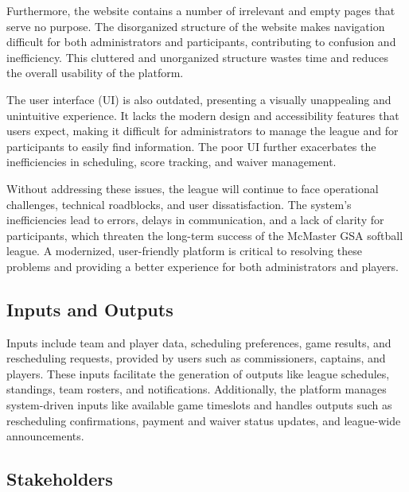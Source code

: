 \documentclass{article}
\begin{document}
Furthermore, the website contains a number of irrelevant and empty pages that serve no purpose. The disorganized structure of the website makes navigation difficult for both administrators and participants, contributing to confusion and inefficiency. This cluttered and unorganized structure wastes time and reduces the overall usability of the platform.

The user interface (UI) is also outdated, presenting a visually unappealing and unintuitive experience. It lacks the modern design and accessibility features that users expect, making it difficult for administrators to manage the league and for participants to easily find information. The poor UI further exacerbates the inefficiencies in scheduling, score tracking, and waiver management.

Without addressing these issues, the league will continue to face operational challenges, technical roadblocks, and user dissatisfaction. The system’s inefficiencies lead to errors, delays in communication, and a lack of clarity for participants, which threaten the long-term success of the McMaster GSA softball league. A modernized, user-friendly platform is critical to resolving these problems and providing a better experience for both administrators and players.

\subsection{Inputs and Outputs}

Inputs include team and player data, scheduling preferences, game results, and rescheduling requests, provided by users such as commissioners, captains, and players. These inputs facilitate the generation of outputs like league schedules, standings, team rosters, and notifications. Additionally, the platform manages system-driven inputs like available game timeslots and handles outputs such as rescheduling confirmations, payment and waiver status updates, and league-wide announcements.

\subsection{Stakeholders}
\end{document}
